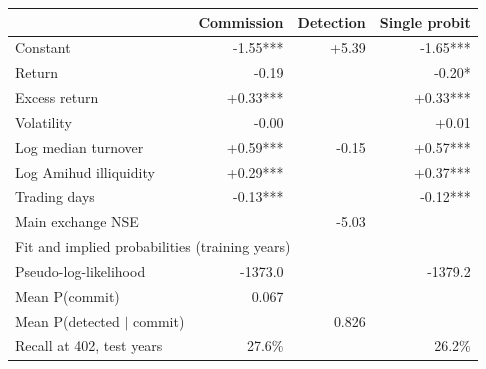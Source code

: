 \begin{tabular*}{\textwidth}[]{l@{\extracolsep\fill}rrr}
\toprule
 & Commission & Detection & Single probit\\
\midrule
Constant & -1.55*** & +5.39 & -1.65***\\
Return & -0.19 &  & -0.20*\\
Excess return & +0.33*** &  & +0.33***\\
Volatility & -0.00 &  & +0.01\\
Log median turnover & +0.59*** & -0.15 & +0.57***\\
Log Amihud illiquidity & +0.29*** &  & +0.37***\\
Trading days & -0.13*** &  & -0.12***\\
Main exchange NSE &  & -5.03 & \\
\midrule
\multicolumn{4}{l}{Fit and implied probabilities (training years)}\\
Pseudo-log-likelihood & -1373.0 &  & -1379.2\\
Mean P(commit) & 0.067 &  & \\
Mean P(detected $\mid$ commit) &  & 0.826 & \\
Recall at 402, test years & 27.6\% &  & 26.2\%\\
\bottomrule
\end{tabular*}
